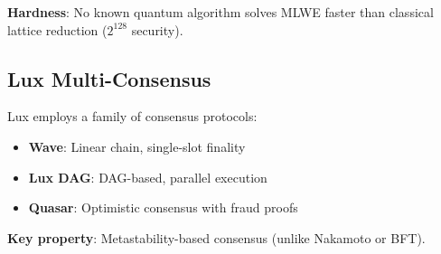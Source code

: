 \textbf{Hardness}: No known quantum algorithm solves MLWE faster than classical lattice reduction ($2^{128}$ security).

\subsection{Lux Multi-Consensus}

Lux employs a family of consensus protocols:

\begin{itemize}
    \item \textbf{Wave}: Linear chain, single-slot finality
    \item \textbf{Lux DAG}: DAG-based, parallel execution
    \item \textbf{Quasar}: Optimistic consensus with fraud proofs
\end{itemize}

\textbf{Key property}: Metastability-based consensus (unlike Nakamoto or BFT).


